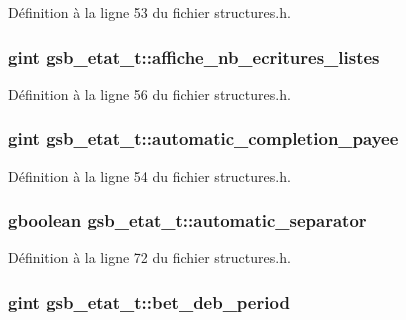 Définition à la ligne 53 du fichier structures.h.

\subsubsection[{affiche\_\-nb\_\-ecritures\_\-listes}]{\setlength{\rightskip}{0pt plus 5cm}gint {\bf gsb\_\-etat\_\-t::affiche\_\-nb\_\-ecritures\_\-listes}}\label{structgsb__etat__t_ab31c706cecdea039591ea7ad86bd67d0}


Définition à la ligne 56 du fichier structures.h.

\subsubsection[{automatic\_\-completion\_\-payee}]{\setlength{\rightskip}{0pt plus 5cm}gint {\bf gsb\_\-etat\_\-t::automatic\_\-completion\_\-payee}}\label{structgsb__etat__t_a6b1800884272ad45f6bea3f48153e162}


Définition à la ligne 54 du fichier structures.h.

\subsubsection[{automatic\_\-separator}]{\setlength{\rightskip}{0pt plus 5cm}gboolean {\bf gsb\_\-etat\_\-t::automatic\_\-separator}}\label{structgsb__etat__t_a5d009282cf4adee9a40cf1b6a7e7327b}


Définition à la ligne 72 du fichier structures.h.

\subsubsection[{bet\_\-deb\_\-period}]{\setlength{\rightskip}{0pt plus 5cm}gint {\bf gsb\_\-etat\_\-t::bet\_\-deb\_\-period}}\label{structgsb__etat__t_abeb050bc20ba0ac1d694a1e1326f2fe2}



